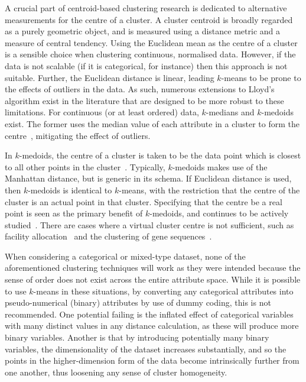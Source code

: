 A crucial part of centroid-based clustering research is dedicated to alternative
measurements for the centre of a cluster. A cluster centroid is broadly regarded
as a purely geometric object, and is measured using a distance metric and a
measure of central tendency. Using the Euclidean mean as the centre of a cluster
is a sensible choice when clustering continuous, normalised data. However, if
the data is not scalable (if it is categorical, for instance) then this approach
is not suitable. Further, the Euclidean distance is linear, leading \(k\)-means
to be prone to the effects of outliers in the data. As such, numerous
extensions to Lloyd's algorithm exist in the literature that are designed to be
more robust to these limitations. For continuous (or at least ordered) data,
\(k\)-medians and \(k\)-medoids exist. The former uses the median value of each
attribute in a cluster to form the centre~\cite{Arya2001,Bradley1997},
mitigating the effect of outliers.

In \(k\)-medoids, the centre of a cluster is taken to be the data point
which is closest to all other points in the cluster~\cite{Kaufman1987}.
Typically, \(k\)-medoids makes use of the Manhattan distance, but is generic in
its schema. If Euclidean distance is used, then \(k\)-medoids is identical to
\(k\)-means, with the restriction that the centre of the cluster is an actual
point in that cluster. Specifying that the centre be a real point is seen as the
primary benefit of \(k\)-medoids, and continues to be actively
studied~\cite{Schubert2019,Ushakov2021}. There are cases where a virtual cluster
centre is not sufficient, such as facility allocation~\cite{Chen2016,Wang2020}
and the clustering of gene sequences~\cite{Johnson2018}.

When considering a categorical or mixed-type dataset, none of the aforementioned
clustering techniques will work as they were intended because the sense of order
does not exist across the entire attribute space. While it is possible to use
\(k\)-means in these situations, by converting any categorical attributes into
pseudo-numerical (binary) attributes by use of dummy coding, this is not
recommended. One potential failing is the inflated effect of categorical
variables with many distinct values in any distance calculation, as these will
produce more binary variables. Another is that by introducing potentially many
binary variables, the dimensionality of the dataset increases substantially, and
so the points in the higher-dimension form of the data become intrinsically
further from one another, thus loosening any sense of cluster homogeneity.

